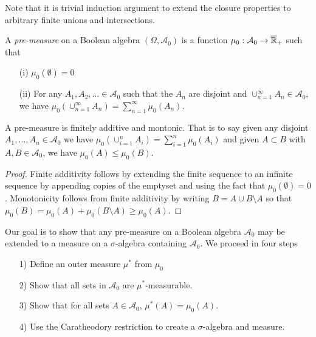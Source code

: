 Note that it is trivial induction argument to extend the closure
properties to arbitrary finite unions and intersections.

\begin{defn}A \emph{pre-measure} on a Boolean algebra $(\Omega, \mathcal{A}_0)$ is
  a function $\mu_0 : \mathcal{A}_0 \to \overline{\mathbb{R}}_+$ such that 
\begin{itemize}
\item[(i)]$\mu_0(\emptyset) = 0$
\item[(ii)]For any $A_1, A_2, \dotsc \in \mathcal{A}_0$ such that the
  $A_n$ are disjoint and 
  $\cup_{n=1}^\infty A_n \in \mathcal{A}_0$, we have
  $\mu_0(\cup_{n=1}^\infty A_n) = \sum_{n=1}^\infty \mu_0(A_n)$.
\end{itemize}
\end{defn}

\begin{lem}A pre-measure is finitely additive and montonic.  That is to say given
  any disjoint $A_1, \dotsc, A_n \in \mathcal{A}_0$ we have
  $\mu_0(\cup_{i=1}^n A_i) = \sum_{i=1}^n \mu_0(A_i)$ and given $A
  \subset B$ with $A, B \in \mathcal{A}_0$, we have $\mu_0(A) \leq \mu_0(B)$.
\end{lem}
\begin{proof}
Finite additivity follows by extending the finite sequence to an infinite sequence by appending
copies of the emptyset and using the fact that $\mu_0(\emptyset)=0$.  Monotonicity follows from finite additivity by writing $B = A \cup
B\setminus A$ so that $\mu_0(B) = \mu_0(A) + \mu_0(B\setminus A) \geq \mu_0(A)$.
\end{proof}

Our goal is to show that any pre-measure on a Boolean algebra
$\mathcal{A}_0$ may be
extended to a measure on a $\sigma$-algebra containing
$\mathcal{A}_0$.  We proceed in four steps
\begin{itemize}
\item[1)] Define an outer measure $\mu^*$ from $\mu_0$
\item[2)] Show that all sets in $\mathcal{A}_0$ are $\mu^*$-measurable.
\item[3)] Show that for all sets $A \in \mathcal{A}_0$, $\mu^*(A) = \mu_0(A)$.
\item[4)] Use the Caratheodory restriction to create a
  $\sigma$-algebra and measure.
\end{itemize}

